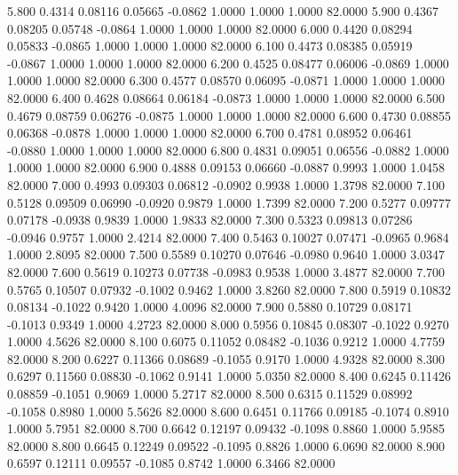    5.800   0.4314   0.08116   0.05665  -0.0862   1.0000   1.0000   1.0000  82.0000
   5.900   0.4367   0.08205   0.05748  -0.0864   1.0000   1.0000   1.0000  82.0000
   6.000   0.4420   0.08294   0.05833  -0.0865   1.0000   1.0000   1.0000  82.0000
   6.100   0.4473   0.08385   0.05919  -0.0867   1.0000   1.0000   1.0000  82.0000
   6.200   0.4525   0.08477   0.06006  -0.0869   1.0000   1.0000   1.0000  82.0000
   6.300   0.4577   0.08570   0.06095  -0.0871   1.0000   1.0000   1.0000  82.0000
   6.400   0.4628   0.08664   0.06184  -0.0873   1.0000   1.0000   1.0000  82.0000
   6.500   0.4679   0.08759   0.06276  -0.0875   1.0000   1.0000   1.0000  82.0000
   6.600   0.4730   0.08855   0.06368  -0.0878   1.0000   1.0000   1.0000  82.0000
   6.700   0.4781   0.08952   0.06461  -0.0880   1.0000   1.0000   1.0000  82.0000
   6.800   0.4831   0.09051   0.06556  -0.0882   1.0000   1.0000   1.0000  82.0000
   6.900   0.4888   0.09153   0.06660  -0.0887   0.9993   1.0000   1.0458  82.0000
   7.000   0.4993   0.09303   0.06812  -0.0902   0.9938   1.0000   1.3798  82.0000
   7.100   0.5128   0.09509   0.06990  -0.0920   0.9879   1.0000   1.7399  82.0000
   7.200   0.5277   0.09777   0.07178  -0.0938   0.9839   1.0000   1.9833  82.0000
   7.300   0.5323   0.09813   0.07286  -0.0946   0.9757   1.0000   2.4214  82.0000
   7.400   0.5463   0.10027   0.07471  -0.0965   0.9684   1.0000   2.8095  82.0000
   7.500   0.5589   0.10270   0.07646  -0.0980   0.9640   1.0000   3.0347  82.0000
   7.600   0.5619   0.10273   0.07738  -0.0983   0.9538   1.0000   3.4877  82.0000
   7.700   0.5765   0.10507   0.07932  -0.1002   0.9462   1.0000   3.8260  82.0000
   7.800   0.5919   0.10832   0.08134  -0.1022   0.9420   1.0000   4.0096  82.0000
   7.900   0.5880   0.10729   0.08171  -0.1013   0.9349   1.0000   4.2723  82.0000
   8.000   0.5956   0.10845   0.08307  -0.1022   0.9270   1.0000   4.5626  82.0000
   8.100   0.6075   0.11052   0.08482  -0.1036   0.9212   1.0000   4.7759  82.0000
   8.200   0.6227   0.11366   0.08689  -0.1055   0.9170   1.0000   4.9328  82.0000
   8.300   0.6297   0.11560   0.08830  -0.1062   0.9141   1.0000   5.0350  82.0000
   8.400   0.6245   0.11426   0.08859  -0.1051   0.9069   1.0000   5.2717  82.0000
   8.500   0.6315   0.11529   0.08992  -0.1058   0.8980   1.0000   5.5626  82.0000
   8.600   0.6451   0.11766   0.09185  -0.1074   0.8910   1.0000   5.7951  82.0000
   8.700   0.6642   0.12197   0.09432  -0.1098   0.8860   1.0000   5.9585  82.0000
   8.800   0.6645   0.12249   0.09522  -0.1095   0.8826   1.0000   6.0690  82.0000
   8.900   0.6597   0.12111   0.09557  -0.1085   0.8742   1.0000   6.3466  82.0000
